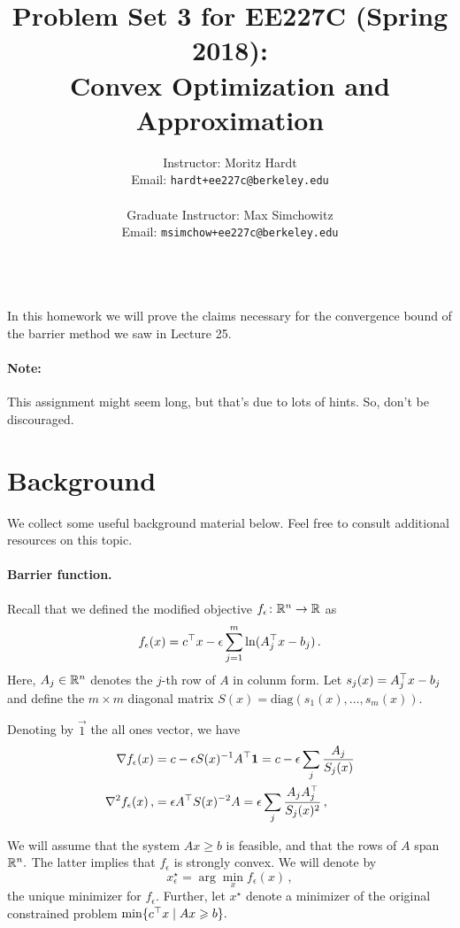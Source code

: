 \documentclass[12pt]{article}
\title{Problem Set 3 for EE227C (Spring 2018):\\
 Convex Optimization and Approximation }
\author{Instructor: Moritz Hardt\\
{\small Email: \tt hardt+ee227c@berkeley.edu}\\ ~\\
Graduate Instructor: Max Simchowitz\\
{\small Email: \tt msimchow+ee227c@berkeley.edu}\\ ~\\
}
\begin{document}



\maketitle

In this homework we will prove the claims necessary for the convergence bound of
the barrier method we saw in Lecture 25.

\paragraph{Note:} This assignment might seem long, but that's due to lots of
hints. So, don't be discouraged.

\section*{Background}

We collect some useful background material below. Feel free to consult
additional resources on this topic.

\paragraph{Barrier function.}
Recall that we defined the modified objective $f_\epsilon\colon\mathbb{R}^n\to\mathbb{R}$ as
\[
f_\epsilon(x) = c^\top x - \epsilon\sum_{j=1}^m \ln(A_j^\top x - b_j)\,.
\]
Here, $A_j\in\mathbb{R}^n$ denotes the $j$-th row of $A$ in colunm form.
Let $s_j(x)= A_j^\top x-b_j$ and define the $m\times m$ diagonal matrix
$S(x)=\mathrm{diag}(s_1(x),\dots,s_m(x)).$

Denoting by $\vec{1}$ the all ones vector, we have
\begin{align*}
\nabla f_\epsilon(x) 
&= c - \epsilon S(x)^{-1}A^\top{\bm{1}}
= c - \epsilon\sum_j \frac{A_j}{S_j(x)}\\
\nabla^2 f_\epsilon(x) \,,
& = \epsilon A^\top S(x)^{-2} A
= \epsilon \sum_j \frac{A_jA_j^\top}{S_j(x)^2}\,,
\end{align*}

We will assume that the system $Ax\ge b$ is feasible, and that the rows of $A$
span~$\mathbb{R}^n.$ The latter implies that $f_\epsilon$ is strongly convex. We will denote
by
\[
x_\epsilon^\star=\arg\min_x f_\epsilon(x)\,,
\]
the unique minimizer for $f_\epsilon.$ Further, let $x^\star$ denote a minimizer
of the original constrained problem $\min\{c^\top x\mid Ax\geqslant b\}.$
\end{document}

